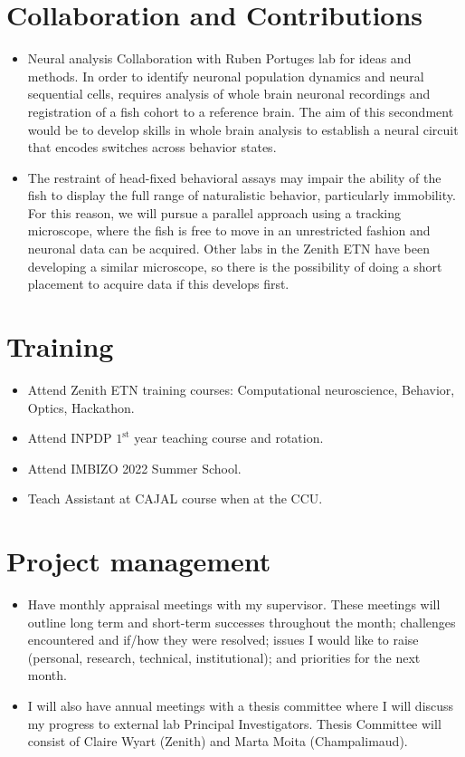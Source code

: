 \documentclass[]{article}
\begin{document}
\section{Collaboration and Contributions}
\begin{itemize}
    \item Neural analysis Collaboration with Ruben Portuges lab for ideas and methods. In order to identify neuronal population dynamics and neural sequential cells, requires analysis of whole brain neuronal recordings and registration of a fish cohort to a reference brain. The aim of this secondment would be to develop skills in whole brain analysis to establish a neural circuit that encodes switches across behavior states.
    \item The restraint of head-fixed behavioral assays may impair the ability of the fish to display the full range of naturalistic behavior, particularly immobility. For this reason, we will pursue a parallel approach using a tracking microscope, where the fish is free to move in an unrestricted fashion and neuronal data can be acquired. Other labs in the Zenith ETN have been developing a similar microscope, so there is the possibility of doing a short placement to acquire data if this develops first.
\end{itemize}

\section{Training}
\begin{itemize}
    \item Attend Zenith ETN training courses: Computational neuroscience, Behavior, Optics, Hackathon.
    \item Attend INPDP $1^{\text{st}}$ year teaching course and rotation.
    \item Attend IMBIZO 2022 Summer School.
    \item Teach Assistant at CAJAL course when at the CCU.
\end{itemize}

\section{Project management}

\begin{itemize}
    \item Have monthly appraisal meetings with my supervisor. These meetings will outline long term and short-term successes throughout the month; challenges encountered and if/how they were resolved; issues I would like to raise (personal, research, technical, institutional); and priorities for the next month.
    \item I will also have annual meetings with a thesis committee where I will discuss my progress to external lab Principal Investigators. Thesis Committee will consist of Claire Wyart (Zenith) and Marta Moita (Champalimaud).
\end{itemize}
\end{document}
